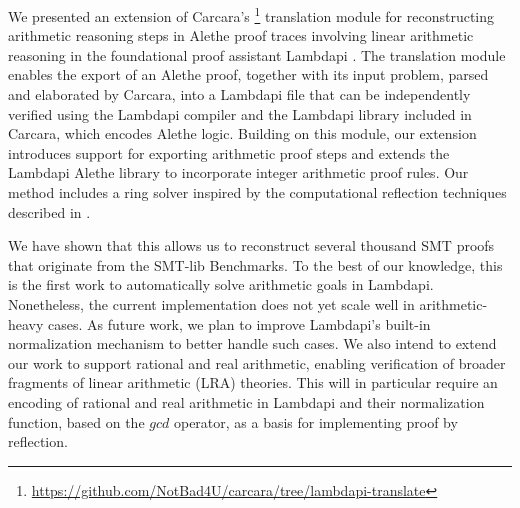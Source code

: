 \documentclass[runningheads,envcountsame]{llncs}
\begin{document}
We presented an extension of Carcara's \cite{carcara}\footnote{\url{https://github.com/NotBad4U/carcara/tree/lambdapi-translate}}
 translation module \cite{ColtellacciMD24} for reconstructing arithmetic reasoning steps in Alethe proof traces involving linear arithmetic reasoning in the foundational proof assistant Lambdapi \cite{lambdapi}.
The translation module enables the export of an Alethe proof, together with its input problem, parsed and elaborated by Carcara, into a Lambdapi file that can be independently verified using the Lambdapi compiler and the Lambdapi library included in Carcara, which encodes Alethe logic.
Building on this module, our extension introduces support for exporting arithmetic proof steps and extends the Lambdapi Alethe library to incorporate integer arithmetic proof rules.
Our method includes a ring solver inspired by the computational reflection techniques described in \cite{reflection-origin-coq,ring-coq}.

We have shown that this allows us to reconstruct several thousand SMT proofs that originate from the SMT-lib Benchmarks.
To the best of our knowledge, this is the first work to automatically solve arithmetic goals in Lambdapi.
Nonetheless, the current implementation does not yet scale well in arithmetic-heavy cases.
As future work, we plan to improve Lambdapi's built-in normalization mechanism to better handle such cases.
We also intend to extend our work to support rational and real arithmetic, enabling verification of broader fragments of linear arithmetic (LRA) theories.
This will in particular require an encoding of rational and real arithmetic in Lambdapi and their normalization function, based on the $\mathit{gcd}$ operator, as a basis for implementing proof by reflection.




%
\end{document}
